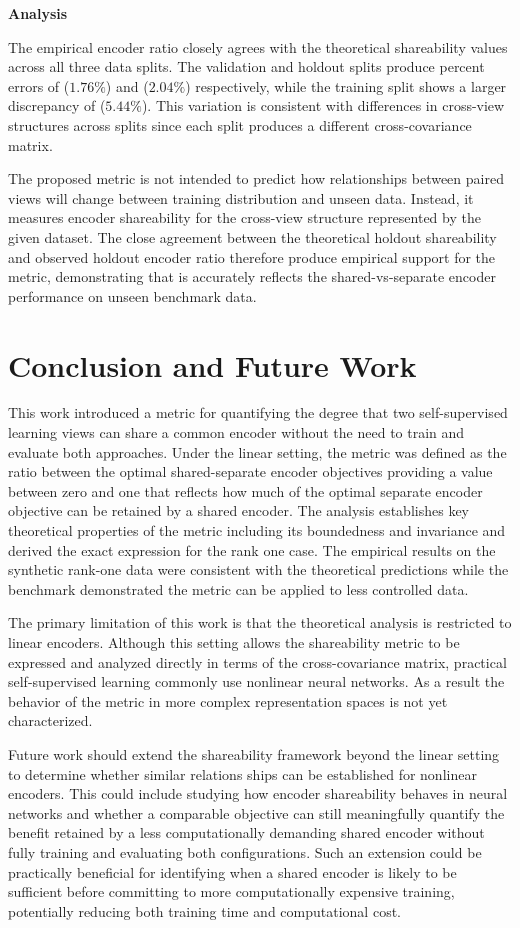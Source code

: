 \documentclass{article}
\begin{document}
\textbf{Analysis}

The empirical encoder ratio closely agrees with the theoretical shareability values across all three data splits. The validation and holdout splits produce percent errors of (\(1.76\%\)) and (\(2.04\%\)) respectively, while the training split shows a larger discrepancy of (\(5.44\%\)). This variation is consistent with differences in cross-view structures across splits since each split produces a different cross-covariance matrix.

The proposed metric is not intended to predict how relationships between paired views will change between training distribution and unseen data. Instead, it measures encoder shareability for the cross-view structure represented by the given dataset. The close agreement between the theoretical holdout shareability and observed holdout encoder ratio therefore produce empirical support for the metric, demonstrating that is accurately reflects the shared-vs-separate encoder performance on unseen benchmark data.

\section{Conclusion and Future Work}

This work introduced a metric for quantifying the degree that two self-supervised learning views can share a common encoder without the need to train and evaluate both approaches. Under the linear setting, the metric was defined as the ratio between the optimal shared-separate encoder objectives providing a value between zero and one that reflects how much of the optimal separate encoder objective can be retained by a shared encoder. The analysis establishes key theoretical properties of the metric including its boundedness and invariance and derived the exact expression for the rank one case. The empirical results on the synthetic rank-one data were consistent with the theoretical predictions while the benchmark demonstrated the metric can be applied to less controlled data.

The primary limitation of this work is that the theoretical analysis is restricted to linear encoders. Although this setting allows the shareability metric to be expressed and analyzed directly in terms of the cross-covariance matrix, practical self-supervised learning commonly use nonlinear neural networks. As a result the behavior of the metric in more complex representation spaces is not yet characterized.

Future work should extend the shareability framework beyond the linear setting to determine whether similar relations ships can be established for nonlinear encoders. This could include studying how encoder shareability behaves in neural networks and whether a comparable objective can still meaningfully quantify the benefit retained by a less computationally demanding shared encoder without fully training and evaluating both configurations. Such an extension could be practically beneficial for identifying when a shared encoder is likely to be sufficient before committing to more computationally expensive training, potentially reducing both training time and computational cost.



\end{document}
